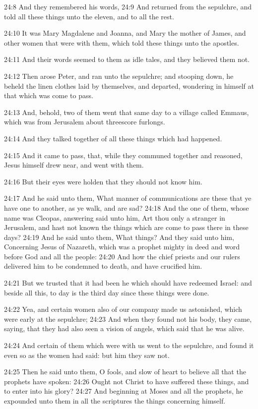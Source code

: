 24:8 And they remembered his words, 24:9 And returned from the sepulchre, and told all these things unto the eleven, and to all the rest.

24:10 It was Mary Magdalene and Joanna, and Mary the mother of James, and other women that were with them, which told these things unto the apostles.

24:11 And their words seemed to them as idle tales, and they believed them not.

24:12 Then arose Peter, and ran unto the sepulchre; and stooping down, he beheld the linen clothes laid by themselves, and departed, wondering in himself at that which was come to pass.

24:13 And, behold, two of them went that same day to a village called Emmaus, which was from Jerusalem about threescore furlongs.

24:14 And they talked together of all these things which had happened.

24:15 And it came to pass, that, while they communed together and reasoned, Jesus himself drew near, and went with them.

24:16 But their eyes were holden that they should not know him.

24:17 And he said unto them, What manner of communications are these that ye have one to another, as ye walk, and are sad?  24:18 And the one of them, whose name was Cleopas, answering said unto him, Art thou only a stranger in Jerusalem, and hast not known the things which are come to pass there in these days?  24:19 And he said unto them, What things? And they said unto him, Concerning Jesus of Nazareth, which was a prophet mighty in deed and word before God and all the people: 24:20 And how the chief priests and our rulers delivered him to be condemned to death, and have crucified him.

24:21 But we trusted that it had been he which should have redeemed Israel: and beside all this, to day is the third day since these things were done.

24:22 Yea, and certain women also of our company made us astonished, which were early at the sepulchre; 24:23 And when they found not his body, they came, saying, that they had also seen a vision of angels, which said that he was alive.

24:24 And certain of them which were with us went to the sepulchre, and found it even so as the women had said: but him they saw not.

24:25 Then he said unto them, O fools, and slow of heart to believe all that the prophets have spoken: 24:26 Ought not Christ to have suffered these things, and to enter into his glory?  24:27 And beginning at Moses and all the prophets, he expounded unto them in all the scriptures the things concerning himself.

